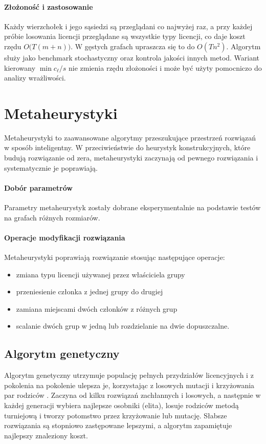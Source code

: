\paragraph{Złożoność i zastosowanie}
Każdy wierzchołek i jego sąsiedzi są przeglądani co najwyżej raz, a przy każdej próbie losowania licencji przeglądane są wszystkie typy licencji, co daje koszt rzędu \(O\bigl(T(m+n)\bigr)\).
W gęstych grafach upraszcza się to do \(O(Tn^2)\).
Algorytm służy jako benchmark stochastyczny oraz kontrola jakości innych metod.
Wariant kierowany \(\min c_\ell/s\) nie zmienia rzędu złożoności i może być użyty pomocniczo do analizy wrażliwości.


\section{Metaheurystyki}

Metaheurystyki to zaawansowane algorytmy przeszukujące przestrzeń rozwiązań w sposób inteligentny. W przeciwieństwie do heurystyk konstrukcyjnych, które budują rozwiązanie od zera, metaheurystyki zaczynają od pewnego rozwiązania i systematycznie je poprawiają.

\paragraph{Dobór parametrów}
Parametry metaheurystyk zostały dobrane eksperymentalnie na podstawie testów na grafach różnych rozmiarów.

\paragraph{Operacje modyfikacji rozwiązania}
Metaheurystyki poprawiają rozwiązanie stosując następujące operacje:
\begin{itemize}
  \item zmiana typu licencji używanej przez właściciela grupy
  \item przeniesienie członka z jednej grupy do drugiej
  \item zamiana miejscami dwóch członków z różnych grup
  \item scalanie dwóch grup w jedną lub rozdzielanie na dwie dopuszczalne.
\end{itemize}

\subsection{Algorytm genetyczny}\label{subsec:ga}
Algorytm genetyczny utrzymuje populację pełnych przydziałów licencyjnych i z pokolenia na pokolenie ulepsza je, korzystając z losowych mutacji i krzyżowania par rodziców \cite{holland1975,goldberg1989}. Zaczyna od kilku rozwiązań zachłannych i losowych, a następnie w każdej generacji wybiera najlepsze osobniki (elita), losuje rodziców metodą turniejową i tworzy potomstwo przez krzyżowanie lub mutację. Słabsze rozwiązania są stopniowo zastępowane lepszymi, a algorytm zapamiętuje najlepszy znaleziony koszt.


